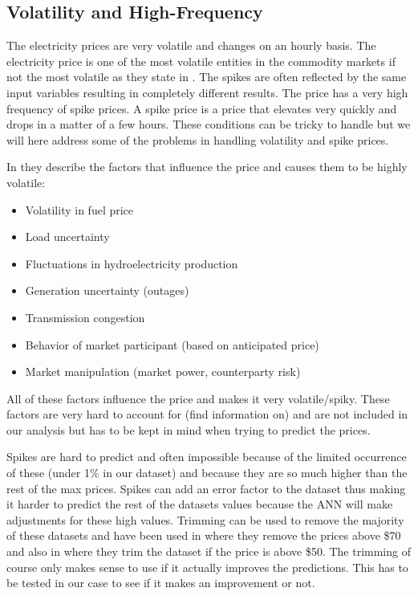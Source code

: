 \subsection{Volatility and High-Frequency}
\label{sec:volatility}
The electricity prices are very volatile and changes on an hourly basis. The electricity price is one of the most volatile entities in the commodity markets \cite{pjmForecast} if not the most volatile as they state in \cite{yamin2004adaptive}. The spikes are often reflected by the same input variables resulting in completely different results. The price has a very high frequency of spike prices. A spike price is a price that elevates very quickly and drops in a matter of a few hours. These conditions can be tricky to handle but we will here address some of the problems in handling volatility and spike prices.

In \cite{singhal2011electricity} they describe the factors that influence the price and causes them to be highly volatile:
\begin{itemize}
	\item Volatility in fuel price
 	\item Load uncertainty
 	\item Fluctuations in hydroelectricity production
 	\item Generation uncertainty (outages)
 	\item Transmission congestion
 	\item Behavior of market participant (based on anticipated price)
 	\item Market manipulation (market power, counterparty risk)
\end{itemize}
All of these factors influence the price and makes it very volatile/spiky. These factors are very hard to account for (find information on) and are not included in our analysis but has to be kept in mind when trying to predict the prices. 

Spikes are hard to predict and often impossible because of the limited occurrence of these (under 1\% in our dataset) and because they are so much higher than the rest of the max prices. Spikes can add an error factor to the dataset thus making it harder to predict the rest of the datasets values because the ANN will make adjustments for these high values. Trimming can be used to remove the majority of these datasets and have been used in \cite{singhal2011electricity} where they remove the prices above \$70 and also in \cite{yamin2004adaptive} where they trim the dataset if the price is above \$50. The trimming of course only makes sense to use if it actually improves the predictions. This has to be tested in our case to see if it makes an improvement or not.

